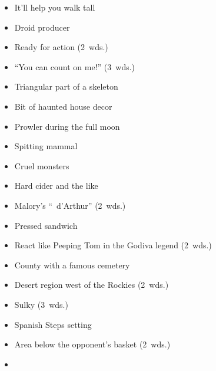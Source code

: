 {\begin{itemize}
      \item
        It'll help you walk tall
      \item
        Droid producer
    \end{itemize}
  \item
    \begin{itemize}
      \item
        Ready for action (2~wds.)
      \item
        ``You can count on me!'' (3~wds.)
    \end{itemize}
  \item
    \begin{itemize}
      \item
        Triangular part of a skeleton
      \item
        Bit of haunted house decor
    \end{itemize}
  \item
    \begin{itemize}
      \item
        Prowler during the full moon
      \item
        Spitting mammal
    \end{itemize}
  \item
    \begin{itemize}
      \item
        Cruel monsters
      \item
        Hard cider and the like
    \end{itemize}
  \item
    \begin{itemize}
      \item
        Malory's ``\blank\ d'Arthur'' (2~wds.)
      \item
        Pressed sandwich
    \end{itemize}
}{%
  \item
    \begin{itemize}
      \item
        React like Peeping Tom in the Godiva legend (2~wds.)
      \item
        County with a famous cemetery
      \item
        Desert region west of the Rockies (2~wds.)
      \item
        Sulky (3~wds.)
      \item
        Spanish Steps setting
      \item
        Area below the opponent's basket (2~wds.)
      \item

\end{itemize}}
